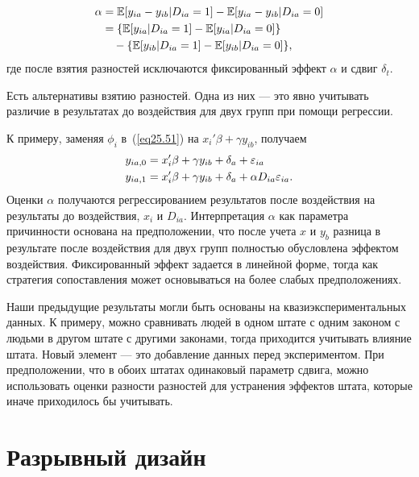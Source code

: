 \begin{align}
\label{eq25.54}
\alpha & = \mathbb{E} [y_{ia} - y_{ib} | D_{ia} = 1] - \mathbb{E} [y_{ia} - y_{ib} | D_{ia} = 0] \\
&  =  \{ \mathbb{E} [y_{ia} | D_{ia} = 1] - \mathbb{E} [y_{ia}| D_{ia} = 0] \} \nonumber  \\
& \quad -  \{ \mathbb{E}[y_{ib} | D_{ia} = 1] - \mathbb{E} [y_{ib}| D_{ia} = 0] \}, \nonumber 
\end{align}
где после взятия разностей исключаются фиксированный эффект $\alpha$ и сдвиг $\delta_t$. 

Есть альтернативы взятию разностей. Одна из них --- это явно учитывать различие в результатах до воздействия для двух групп при помощи регрессии. 

К примеру, заменяя $\phi_i$ в~(\ref{eq25.51}) на $x_i' \beta + \gamma y_{ib}$, получаем
\begin{align}
\label{eq25.55}
& y_{ia,0} = x_i' \beta + \gamma y_{ib} + \delta_a + \varepsilon_{ia} \\
& y_{ia,1} = x_i' \beta + \gamma y_{ib} + \delta_a + \alpha D_{ia} \varepsilon_{ia}. \nonumber 
\end{align}
Оценки $\alpha$ получаются регрессированием результатов после воздействия на результаты до воздействия, $x_i$ и $D_{ia}$. Интерпретация $\alpha$ как параметра причинности основана на предположении, что после учета $x$ и $y_b$ разница в результате после воздействия для двух групп полностью обусловлена эффектом воздействия. Фиксированный эффект задается в линейной форме, тогда как стратегия сопоставления может основываться на более слабых предположениях. 

Наши предыдущие результаты могли быть основаны на квазиэкспериментальных данных. К примеру, можно сравнивать людей в одном штате с одним законом с людьми в другом штате с другими законами, тогда приходится учитывать влияние штата. Новый элемент --- это добавление данных перед экспериментом. При предположении, что в обоих штатах одинаковый параметр сдвига, можно использовать оценки разности разностей для устранения эффектов штата, которые иначе приходилось бы учитывать. 

\section{Разрывный дизайн}

